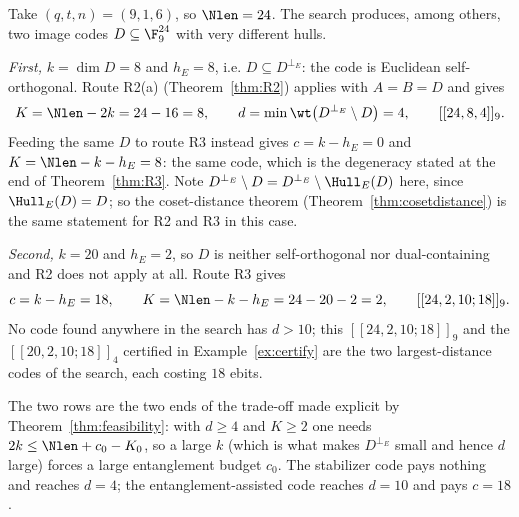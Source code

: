 \begin{example}\label{ex:routes}
Take $(q,t,n)=(9,1,6)$, so $\Nlen=24$. The search produces, among others, two
image codes $D\subseteq\F_9^{24}$ with very different hulls.

\emph{First,} $k=\dim D=8$ and $h_E=8$, i.e. $D\subseteq D^{\perp_E}$: the
code is Euclidean self-orthogonal. Route R2(a)
(Theorem~\ref{thm:R2}) applies with $A=B=D$ and gives
\[
  K=\Nlen-2k=24-16=8,\qquad
  d=\min\wt\bigl(D^{\perp_E}\setminus D\bigr)=4,\qquad
  [[24,8,4]]_9 .
\]
Feeding the same $D$ to route R3 instead gives $c=k-h_E=0$ and
$K=\Nlen-k-h_E=8$: the same code, which is the degeneracy stated at the end of
Theorem~\ref{thm:R3}. Note $D^{\perp_E}\setminus D=D^{\perp_E}\setminus
\Hull_E(D)$ here, since $\Hull_E(D)=D$; so the coset-distance theorem
(Theorem~\ref{thm:cosetdistance}) is the same statement for R2 and R3 in this
case.

\emph{Second,} $k=20$ and $h_E=2$, so $D$ is neither self-orthogonal nor
dual-containing and R2 does not apply at all. Route R3 gives
\[
  c=k-h_E=18,\qquad K=\Nlen-k-h_E=24-20-2=2,\qquad
  [[24,2,10;18]]_9 .
\]
No code found anywhere in the search has $d>10$; this $[[24,2,10;18]]_9$ and
the $[[20,2,10;18]]_4$ certified in Example~\ref{ex:certify} are the two
largest-distance codes of the search, each costing $18$ ebits.

The two rows are the two ends of the trade-off made explicit by
Theorem~\ref{thm:feasibility}: with $d\ge4$ and $K\ge2$ one needs
$2k\le\Nlen+c_0-K_0$, so a large $k$ (which is what makes $D^{\perp_E}$ small
and hence $d$ large) forces a large entanglement budget $c_0$. The
stabilizer code pays nothing and reaches $d=4$; the entanglement-assisted code
reaches $d=10$ and pays $c=18$.
\end{example}
